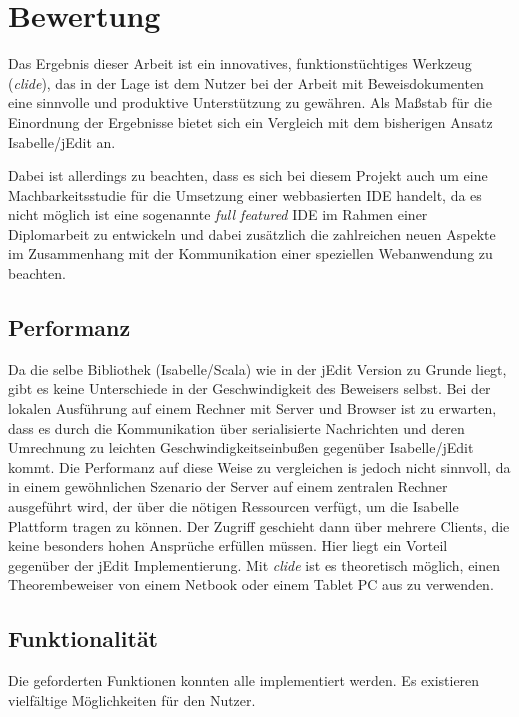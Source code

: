 \chapter{Bewertung}

Das Ergebnis dieser Arbeit ist ein innovatives, funktionstüchtiges Werkzeug (\textit{clide}), das in
der Lage ist dem Nutzer bei der Arbeit mit Beweisdokumenten eine sinnvolle und produktive
Unterstützung zu gewähren. Als Maßstab für die Einordnung der Ergebnisse bietet sich ein Vergleich
mit dem bisherigen Ansatz Isabelle/jEdit an.

Dabei ist allerdings zu beachten, dass es sich bei diesem Projekt auch um eine Machbarkeitsstudie
für die Umsetzung einer webbasierten IDE handelt, da es nicht möglich ist eine sogenannte
\textit{full featured} IDE im Rahmen einer Diplomarbeit zu entwickeln und dabei zusätzlich die
zahlreichen neuen Aspekte im Zusammenhang mit der Kommunikation einer speziellen Webanwendung zu
beachten.

\section{Performanz}

Da die selbe Bibliothek (Isabelle/Scala) wie in der jEdit Version zu Grunde liegt, gibt es keine
Unterschiede in der Geschwindigkeit des Beweisers selbst. Bei der lokalen Ausführung auf einem
Rechner mit Server und Browser ist zu erwarten, dass es durch die Kommunikation über serialisierte
Nachrichten und deren Umrechnung zu leichten Geschwindigkeitseinbußen gegenüber Isabelle/jEdit
kommt. Die Performanz auf diese Weise zu vergleichen is jedoch nicht sinnvoll, da in einem
gewöhnlichen Szenario der Server auf einem zentralen Rechner ausgeführt wird, der über die nötigen
Ressourcen verfügt, um die Isabelle Plattform tragen zu können. Der Zugriff geschieht dann über
mehrere Clients, die keine besonders hohen Ansprüche erfüllen müssen. Hier liegt ein Vorteil
gegenüber der jEdit Implementierung. Mit \textit{clide} ist es theoretisch möglich, einen
Theorembeweiser von einem Netbook oder einem Tablet PC aus zu verwenden.

\section{Funktionalität}

Die geforderten Funktionen konnten alle implementiert werden. Es existieren vielfältige
Möglichkeiten für den Nutzer.

